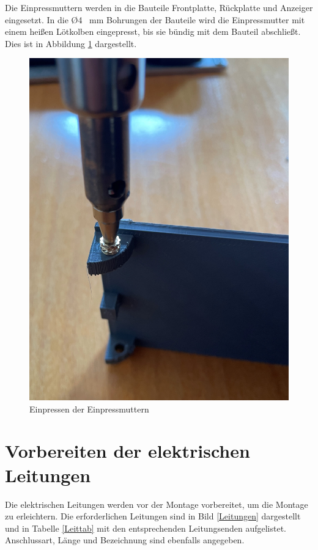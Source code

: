 Die Einpressmuttern werden in die Bauteile Frontplatte, Rückplatte und Anzeiger eingesetzt. In die \O 4 \ mm Bohrungen der Bauteile wird die Einpressmutter mit einem heißen Lötkolben eingepresst, bis sie bündig mit dem Bauteil abschließt. Dies ist in Abbildung \ref{Einpress} dargestellt.

\begin{figure}[H]
	\begin{center}
		\includegraphics[width=\textwidth]{Images/Einpress.jpg}
		\caption{Einpressen der Einpressmuttern} \label{Einpress}
	\end{center}
\end{figure}

\section{Vorbereiten der elektrischen Leitungen}

Die elektrischen Leitungen werden vor der Montage vorbereitet, um die Montage zu erleichtern. Die erforderlichen Leitungen sind in Bild \ref{Leitungen} dargestellt und in Tabelle \ref{Leittab} mit den entsprechenden Leitungsenden aufgelistet. Anschlussart, Länge und Bezeichnung sind ebenfalls angegeben.

